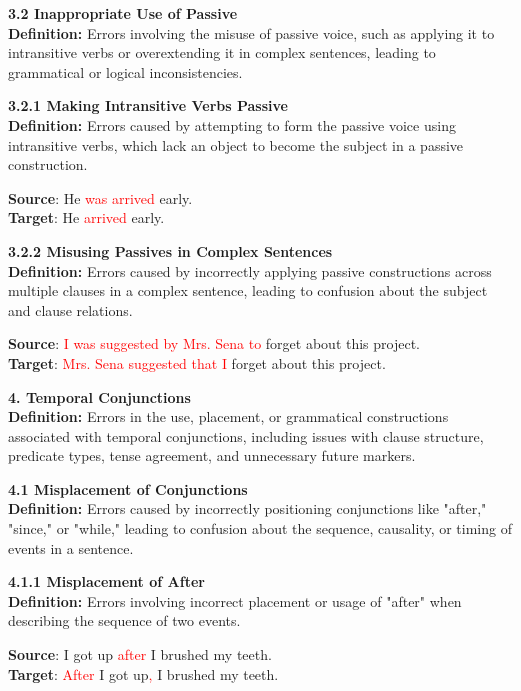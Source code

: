\begin{tcolorbox}[breakable]
\noindent \textbf{3.2 Inappropriate Use of Passive}\\
\textbf{Definition:} Errors involving the misuse of passive voice, such as applying it to intransitive verbs or overextending it in complex sentences, leading to grammatical or logical inconsistencies.

\noindent \textbf{3.2.1 Making Intransitive Verbs Passive}\\
\textbf{Definition:} Errors caused by attempting to form the passive voice using intransitive verbs, which lack an object to become the subject in a passive construction.


\textbf{Source}: He \textcolor{red}{was arrived} early. \\
\textbf{Target}: He \textcolor{red}{arrived} early.


\noindent \textbf{3.2.2 Misusing Passives in Complex Sentences}\\
\textbf{Definition:} Errors caused by incorrectly applying passive constructions across multiple clauses in a complex sentence, leading to confusion about the subject and clause relations.


\textbf{Source}: \textcolor{red}{I was suggested by Mrs. Sena to} forget about this project. \\
\textbf{Target}: \textcolor{red}{Mrs. Sena suggested that I} forget about this project.



\noindent \textbf{4. Temporal Conjunctions}\\
\textbf{Definition:} Errors in the use, placement, or grammatical constructions associated with temporal conjunctions, including issues with clause structure, predicate types, tense agreement, and unnecessary future markers.

\noindent \textbf{4.1 Misplacement of Conjunctions}\\
\textbf{Definition:} Errors caused by incorrectly positioning conjunctions like "after," "since," or "while," leading to confusion about the sequence, causality, or timing of events in a sentence.

\noindent \textbf{4.1.1 Misplacement of After}\\
\textbf{Definition:} Errors involving incorrect placement or usage of "after" when describing the sequence of two events.


\textbf{Source}: I got up \textcolor{red}{after} I brushed my teeth. \\
\textbf{Target}: \textcolor{red}{After} I got up\textcolor{red}{,} I brushed my teeth.



\end{tcolorbox}
